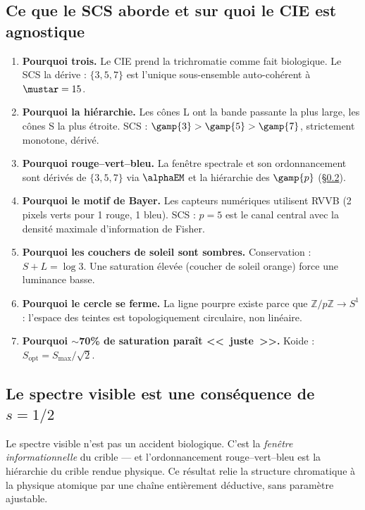 \documentclass[12pt,a4paper]{article}
\begin{document}
\subsection{Ce que le SCS aborde et sur quoi le CIE est agnostique}

\begin{enumerate}[nosep]
\item \textbf{Pourquoi trois.} Le CIE prend la trichromatie comme fait
  biologique. Le SCS la d\'erive : $\{3,5,7\}$ est l'unique
  sous-ensemble auto-coh\'erent \`a $\mustar = 15$.
\item \textbf{Pourquoi la hi\'erarchie.} Les c\^ones L ont la bande
  passante la plus large, les c\^ones S la plus \'etroite. SCS :
  $\gamp{3} > \gamp{5} > \gamp{7}$, strictement monotone, d\'eriv\'e.
\item \textbf{Pourquoi rouge--vert--bleu.} La fen\^etre spectrale et
  son ordonnancement sont d\'eriv\'es de $\{3,5,7\}$ via $\alphaEM$
  et la hi\'erarchie des $\gamp{p}$ (\S\ref{sec:visible}).
\item \textbf{Pourquoi le motif de Bayer.} Les capteurs num\'eriques
  utilisent RVVB (2 pixels verts pour 1 rouge, 1 bleu). SCS : $p=5$
  est le canal central avec la densit\'e maximale d'information de
  Fisher.
\item \textbf{Pourquoi les couchers de soleil sont sombres.}
  Conservation : $S + L = \log 3$. Une saturation \'elev\'ee (coucher
  de soleil orange) force une luminance basse.
\item \textbf{Pourquoi le cercle se ferme.} La ligne pourpre existe
  parce que $\mathbb{Z}/p\mathbb{Z} \to S^1$ : l'espace des teintes est
  topologiquement circulaire, non lin\'eaire.
\item \textbf{Pourquoi $\sim$70\% de saturation para\^it <<~juste~>>.}
  Koide : $S_{\text{opt}} = S_{\max}/\sqrt{2}$.
\end{enumerate}

\subsection{Le spectre visible est une cons\'equence de $s = 1/2$}
\label{sec:visible}

Le spectre visible n'est pas un accident biologique. C'est la
\emph{fen\^etre informationnelle} du crible --- et l'ordonnancement
rouge--vert--bleu est la hi\'erarchie du crible rendue physique. Ce
r\'esultat relie la structure chromatique \`a la physique atomique par
une cha\^ine enti\`erement d\'eductive, sans param\`etre ajustable.
\end{document}
